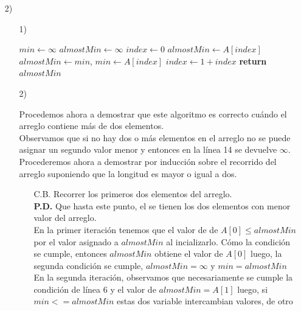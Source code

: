 \documentclass[a4paper, 12pt]{report}
\begin{document}
\begin{enumerate}
{\begin{enumerate}
{    Ergo nuestro algoritmo $\in$ O(n) en complejidad}
\end{enumerate}
}

\item[2)]{
\begin{enumerate}
    \item[1)]{
        \begin{algorithmic}[1]
            \State $min\gets \infty$
            \State $almostMin\gets \infty$
            \State $index\gets 0$
                    \State $almostMin\gets A[index]$
                        \State $almostMin\gets min$, $min\gets A[index]$
                    \EndIf
                \EndIf
                \State $index\gets 1 + index$
            \EndWhile\label{euclidendwhile}
            \State \textbf{return} $almostMin$
            \EndProcedure
        \end{algorithmic}
    }
    \item[2)]{Procedemos ahora a demostrar que este algoritmo es correcto cuándo
        el arreglo contiene más de dos elementos.\\
        Observamos que si no hay dos o más elementos en el arreglo no se puede
        asignar un segundo valor menor y entonces en la línea 14 se devuelve
        $\infty$.\\
        Procederemos ahora a demostrar por inducción sobre el recorrido del
        arreglo suponiendo que la longitud es mayor o igual a dos.
        \begin{enumerate}
        \item[C.B.]{Recorrer los primeros dos elementos del arreglo.\\
            \textbf{P.D.} Que hasta este punto, el se tienen los dos elementos
            con menor valor del arreglo.\\
            En la primer iteración tenemos que el valor de de $A[0] \leq almostMin$
            por el valor asignado a $almostMin$ al incializarlo. Cómo la condición se
            cumple, entonces $almostMin$ obtiene el valor de $A[0]$ luego, la
            segunda condición se cumple, $almostMin = \infty$ y $min = almostMin$
            En la segunda iteración, observamos que necesariamente se cumple la
            condición de línea 6 y el valor de $almostMin = A[1]$ luego, si
            $min <= almostMin$ estas dos variable intercambian valores, de otro
}
\end{enumerate}}
\end{enumerate}}
\end{enumerate}
\end{document}
